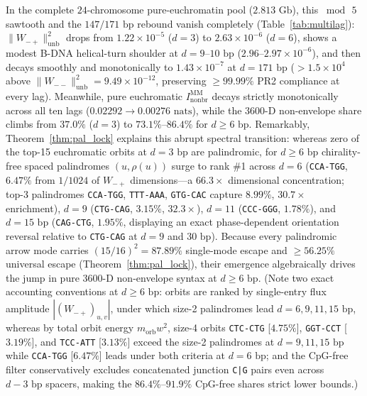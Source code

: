 \documentclass[11pt,a4paper]{article}
\newcommand{\Wmp}{W_{-+}}
\newcommand{\Wmm}{W_{--}}
\newcommand{\Inb}{I_{\mathrm{nonbr}}^{\mathrm{MM}}}
\begin{document}
In the complete $24$-chromosome pure-euchromatin pool ($2.813\text{ Gb}$), this $\bmod\,5$ sawtooth and the $147/171\text{ bp}$ rebound vanish completely (Table~\ref{tab:multilag}): $\|\Wmp\|^2_{\mathrm{unb}}$ drops from $1.22\times 10^{-5}$ ($d=3$) to $2.63\times 10^{-6}$ ($d=6$), shows a modest B-DNA helical-turn shoulder at $d=9\text{--}10\text{ bp}$ ($2.96\text{--}2.97\times 10^{-6}$), and then decays smoothly and monotonically to $1.43\times 10^{-7}$ at $d=171\text{ bp}$ ($>1.5\times 10^4$ above $\|\Wmm\|^2_{\mathrm{unb}} = 9.49\times 10^{-12}$, preserving $\ge 99.99\%$ PR2 compliance at every lag). Meanwhile, pure euchromatic $\Inb$ decays strictly monotonically across all ten lags ($0.02292 \to 0.00276\text{ nats}$), while the 3600-D non-envelope share climbs from $37.0\%$ ($d=3$) to $73.1\%$--$86.4\%$ for $d \ge 6\text{ bp}$. Remarkably, Theorem~\ref{thm:pal_lock} explains this abrupt spectral transition: whereas zero of the top-15 euchromatic orbits at $d=3\text{ bp}$ are palindromic, for $d \ge 6\text{ bp}$ chirality-free spaced palindromes $(u,\rho(u))$ surge to rank \#1 across $d=6$ (\texttt{CCA-TGG}, $6.47\%$ from $1/1024$ of $\Wmp$ dimensions---a $66.3\times$ dimensional concentration; top-3 palindromes \texttt{CCA-TGG}, \texttt{TTT-AAA}, \texttt{GTG-CAC} capture $8.99\%$, $30.7\times$ enrichment), $d=9$ (\texttt{CTG-CAG}, $3.15\%$, $32.3\times$), $d=11$ (\texttt{CCC-GGG}, $1.78\%$), and $d=15\text{ bp}$ (\texttt{CAG-CTG}, $1.95\%$, displaying an exact phase-dependent orientation reversal relative to \texttt{CTG-CAG} at $d=9$ and $30\text{ bp}$). Because every palindromic arrow mode carries $(15/16)^2 = 87.89\%$ single-mode escape and $\ge 56.25\%$ universal escape (Theorem~\ref{thm:pal_lock}), their emergence algebraically drives the jump in pure 3600-D non-envelope syntax at $d \ge 6\text{ bp}$. (Note two exact accounting conventions at $d\ge 6\text{ bp}$: orbits are ranked by single-entry flux amplitude $|(\Wmp)_{u,v}|$, under which size-2 palindromes lead $d=6,9,11,15\text{ bp}$, whereas by total orbit energy $m_{\mathrm{orb}}w^2$, size-4 orbits \texttt{CTC-CTG} [$4.75\%$], \texttt{GGT-CCT} [$3.19\%$], and \texttt{TCC-ATT} [$3.13\%$] exceed the size-2 palindromes at $d=9,11,15\text{ bp}$ while \texttt{CCA-TGG} [$6.47\%$] leads under both criteria at $d=6\text{ bp}$; and the CpG-free filter conservatively excludes concatenated junction \texttt{C|G} pairs even across $d-3\text{ bp}$ spacers, making the $86.4\%$--$91.9\%$ CpG-free shares strict lower bounds.)
\end{document}

